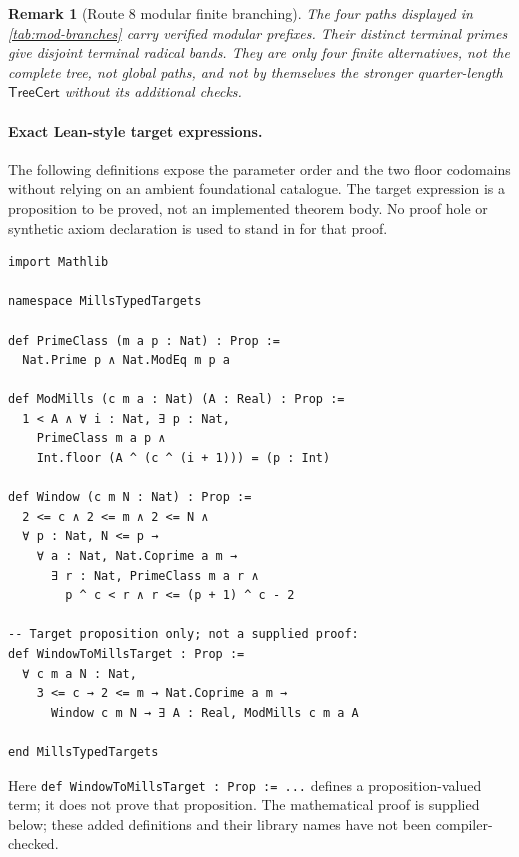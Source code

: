 \documentclass[11pt,reqno]{amsart}
\theoremstyle{blueplain}
\newtheorem{remark}{Remark}[section]
\numberwithin{equation}{section}
\begin{document}
\begin{remark}[Route 8 modular finite branching]
The four paths displayed in \cref{tab:mod-branches} carry verified modular
prefixes. Their distinct terminal primes give disjoint terminal radical
bands. They are only four finite alternatives, not the complete tree,
not global paths, and not by themselves the stronger quarter-length
\(\textsf{TreeCert}\) without its additional checks.
\end{remark}

\paragraph{Exact Lean-style target expressions.}
The following definitions expose the parameter order and the two floor
codomains without relying on an ambient foundational catalogue. The target
expression is a proposition to be proved, not an implemented theorem body.
No proof hole or synthetic axiom declaration is used to stand in for that proof.
\begin{lstlisting}[style=lean,basicstyle=\ttfamily\scriptsize]
import Mathlib

namespace MillsTypedTargets

def PrimeClass (m a p : Nat) : Prop :=
  Nat.Prime p ∧ Nat.ModEq m p a

def ModMills (c m a : Nat) (A : Real) : Prop :=
  1 < A ∧ ∀ i : Nat, ∃ p : Nat,
    PrimeClass m a p ∧
    Int.floor (A ^ (c ^ (i + 1))) = (p : Int)

def Window (c m N : Nat) : Prop :=
  2 <= c ∧ 2 <= m ∧ 2 <= N ∧
  ∀ p : Nat, N <= p →
    ∀ a : Nat, Nat.Coprime a m →
      ∃ r : Nat, PrimeClass m a r ∧
        p ^ c < r ∧ r <= (p + 1) ^ c - 2

-- Target proposition only; not a supplied proof:
def WindowToMillsTarget : Prop :=
  ∀ c m a N : Nat,
    3 <= c → 2 <= m → Nat.Coprime a m →
      Window c m N → ∃ A : Real, ModMills c m a A

end MillsTypedTargets
\end{lstlisting}
Here \texttt{def WindowToMillsTarget : Prop := ...} defines a proposition-valued term;
it does not prove that proposition. The mathematical proof is supplied below;
these added definitions and their library names have not been compiler-checked.
\end{document}
